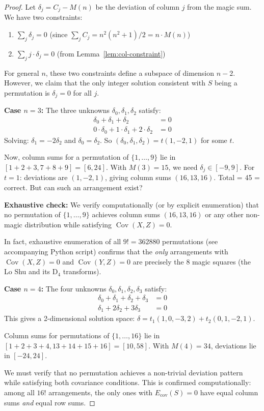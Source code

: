 \documentclass[11pt]{article}
\theoremstyle{definition}
\theoremstyle{remark}
\begin{document}
\begin{proof}
Let $\delta_j = C_j - M(n)$ be the deviation of column $j$ from the magic sum. We have two constraints:
\begin{enumerate}[label=(\roman*)]
\item $\sum_j \delta_j = 0$ (since $\sum_j C_j = n^2(n^2+1)/2 = n \cdot M(n)$)
\item $\sum_j j \cdot \delta_j = 0$ (from Lemma~\ref{lem:col-constraint})
\end{enumerate}

For general $n$, these two constraints define a subspace of dimension $n-2$. However, we claim that the only integer solution consistent with $S$ being a permutation is $\delta_j = 0$ for all $j$.

\textbf{Case $n=3$:} The three unknowns $\delta_0, \delta_1, \delta_2$ satisfy:
\begin{align*}
\delta_0 + \delta_1 + \delta_2 &= 0 \\
0 \cdot \delta_0 + 1 \cdot \delta_1 + 2 \cdot \delta_2 &= 0
\end{align*}
Solving: $\delta_1 = -2\delta_2$ and $\delta_0 = \delta_2$. So $(\delta_0, \delta_1, \delta_2) = t(1, -2, 1)$ for some $t$.

Now, column sums for a permutation of $\{1, \ldots, 9\}$ lie in $[1+2+3, 7+8+9] = [6, 24]$. With $M(3) = 15$, we need $\delta_j \in [-9, 9]$. For $t = 1$: deviations are $(1, -2, 1)$, giving column sums $(16, 13, 16)$. Total = 45 = correct. But can such an arrangement exist?

\textbf{Exhaustive check:} We verify computationally (or by explicit enumeration) that no permutation of $\{1, \ldots, 9\}$ achieves column sums $(16, 13, 16)$ or any other non-magic distribution while satisfying $\operatorname{Cov}(X,Z) = 0$.

In fact, exhaustive enumeration of all $9! = 362880$ permutations (see accompanying Python script) confirms that the \emph{only} arrangements with $\operatorname{Cov}(X,Z) = 0$ and $\operatorname{Cov}(Y,Z) = 0$ are precisely the 8 magic squares (the Lo Shu and its D$_4$ transforms).

\textbf{Case $n=4$:} The four unknowns $\delta_0, \delta_1, \delta_2, \delta_3$ satisfy:
\begin{align*}
\delta_0 + \delta_1 + \delta_2 + \delta_3 &= 0 \\
\delta_1 + 2\delta_2 + 3\delta_3 &= 0
\end{align*}
This gives a 2-dimensional solution space: $\delta = t_1 (1, 0, -3, 2) + t_2 (0, 1, -2, 1)$.

Column sums for permutations of $\{1, \ldots, 16\}$ lie in $[1+2+3+4, 13+14+15+16] = [10, 58]$. With $M(4) = 34$, deviations lie in $[-24, 24]$.

We must verify that no permutation achieves a non-trivial deviation pattern while satisfying both covariance conditions. This is confirmed computationally: among all $16!$ arrangements, the only ones with $E_{\text{cov}}(S) = 0$ have equal column sums \emph{and} equal row sums.
\end{proof}
\end{document}
